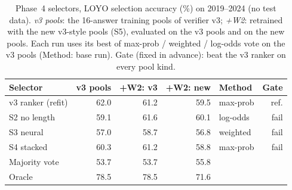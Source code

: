 \begin{table}[!t]
\centering
\scriptsize
\caption{Phase~4 selectors, LOYO selection accuracy (\%) on 2019--2024 (no test data). \emph{v3 pools}: the 16-answer training pools of verifier v3; \emph{+W2}: retrained with the new v3-style pools (S5), evaluated on the v3 pools and on the new pools. Each run uses its best of max-prob / weighted / log-odds vote on the v3 pools (Method: base run). Gate (fixed in advance): beat the v3 ranker on every pool kind.}
\label{tab:v4sel}
\setlength{\tabcolsep}{2.5pt}
\begin{tabular}{lrrrlr}
\toprule
Selector & v3 pools & +W2: v3 & +W2: new & Method & Gate \\
\midrule
v3 ranker (refit) & 62.0 & 61.2 & 59.5 & max-prob & ref. \\
S2 no length & 59.1 & 61.6 & 60.1 & log-odds & fail \\
S3 neural & 57.0 & 58.7 & 56.8 & weighted & fail \\
S4 stacked & 60.3 & 61.2 & 58.8 & max-prob & fail \\
\midrule
Majority vote & 53.7 & 53.7 & 55.8 &  &  \\
Oracle & 78.5 & 78.5 & 71.6 &  &  \\
\bottomrule
\end{tabular}
\end{table}
